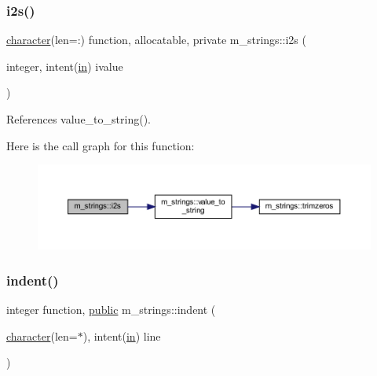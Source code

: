 \mbox{\label{namespacem__strings_a83cecfcd4582760bf2b1e12364c29443}} 
\subsubsection{\texorpdfstring{i2s()}{i2s()}}
{\footnotesize\ttfamily \hyperlink{option__stopwatch_83_8txt_abd4b21fbbd175834027b5224bfe97e66}{character}(len=\+:) function, allocatable, private m\+\_\+strings\+::i2s (\begin{DoxyParamCaption}\item[{integer, intent(\hyperlink{M__journal_83_8txt_afce72651d1eed785a2132bee863b2f38}{in})}]{ivalue }\end{DoxyParamCaption})\hspace{0.3cm}{\ttfamily [private]}}



References value\+\_\+to\+\_\+string().

Here is the call graph for this function\+:
\nopagebreak
\begin{figure}[H]
\begin{center}
\leavevmode
\includegraphics[width=350pt]{namespacem__strings_a83cecfcd4582760bf2b1e12364c29443_cgraph}
\end{center}
\end{figure}
\mbox{\label{namespacem__strings_a020dcca7f01d33eedf28b17518a22b69}} 
\subsubsection{\texorpdfstring{indent()}{indent()}}
{\footnotesize\ttfamily integer function, \hyperlink{M__stopwatch_83_8txt_a2f74811300c361e53b430611a7d1769f}{public} m\+\_\+strings\+::indent (\begin{DoxyParamCaption}\item[{\hyperlink{option__stopwatch_83_8txt_abd4b21fbbd175834027b5224bfe97e66}{character}(len=$\ast$), intent(\hyperlink{M__journal_83_8txt_afce72651d1eed785a2132bee863b2f38}{in})}]{line }\end{DoxyParamCaption})}



